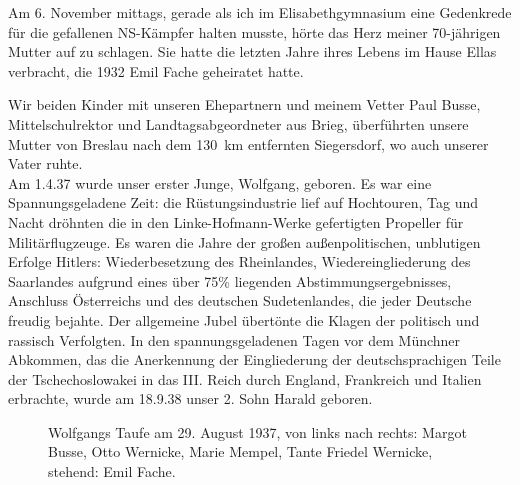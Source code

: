 Am 6. November mittags, gerade als ich im Elisabethgymnasium eine Gedenkrede für die gefallenen NS-Kämpfer halten musste, hörte das Herz meiner 70-jährigen Mutter auf zu schlagen. Sie hatte die letzten Jahre ihres Lebens im Hause Ellas verbracht, die 1932 Emil Fache geheiratet hatte.

Wir beiden Kinder mit unseren Ehepartnern und meinem Vetter Paul Busse, Mittelschulrektor und Landtagsabgeordneter aus Brieg, überführten unsere Mutter von Breslau nach dem 130~km entfernten Siegersdorf, wo auch unserer Vater ruhte.\\

Am 1.4.37 wurde unser erster Junge, Wolfgang, geboren. Es war eine Spannungsgeladene Zeit: die Rüstungsindustrie lief auf Hochtouren, Tag und Nacht dröhnten die in den Linke-Hofmann-Werke gefertigten Propeller für Militärflugzeuge. Es waren die Jahre der großen außenpolitischen, unblutigen Erfolge Hitlers: Wiederbesetzung des Rheinlandes, Wiedereingliederung des Saarlandes aufgrund eines über 75\% liegenden Abstimmungsergebnisses, Anschluss Österreichs und des deutschen Sudetenlandes, die jeder Deutsche freudig bejahte. Der allgemeine Jubel übertönte die Klagen der politisch und rassisch Verfolgten. In den spannungsgeladenen Tagen vor dem Münchner Abkommen, das die Anerkennung der Eingliederung der deutschsprachigen Teile der Tschechoslowakei in das III. Reich durch England, Frankreich und Italien erbrachte, wurde am 18.9.38 unser 2. Sohn Harald geboren.

\begin{figure}[h]
	\caption[Wolfgangs Taufe]{Wolfgangs Taufe am 29. August 1937, von links nach rechts: Margot Busse, Otto Wernicke, Marie Mempel, Tante Friedel Wernicke, stehend: Emil Fache.\footnotemark}
	\label{fig:wolfgangs_taufe}
\end{figure}

